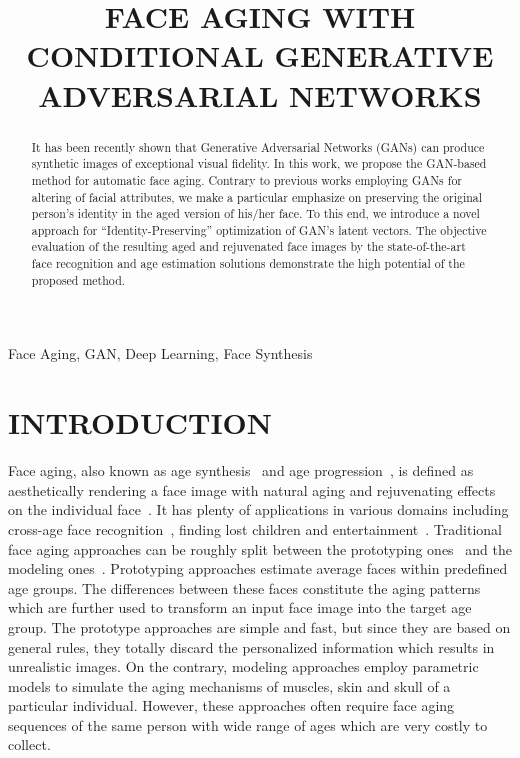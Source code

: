 \documentclass{article}
\title{FACE AGING WITH CONDITIONAL GENERATIVE ADVERSARIAL NETWORKS}
\begin{document}
\maketitle

\begin{abstract}

It has been recently shown that Generative Adversarial Networks (GANs) can produce synthetic images of exceptional visual fidelity.
In this work, we propose the GAN-based method for automatic face aging.
Contrary to previous works employing GANs for altering of facial attributes, we make a particular emphasize on preserving the original person's identity in the aged version of his/her face.
To this end, we introduce a novel approach for ``Identity-Preserving'' optimization of GAN's latent vectors.
The objective evaluation of the resulting aged and rejuvenated face images by the state-of-the-art face recognition and age estimation solutions demonstrate the high potential of the proposed method. 

\end{abstract}

\begin{keywords}

Face Aging, GAN, Deep Learning, Face Synthesis

\end{keywords}

\section{INTRODUCTION}
\label{sec:introduction}

Face aging, also known as age synthesis~\cite{fu2010age} and age progression~\cite{shu2015personalized}, is defined as aesthetically rendering a face image with natural aging and rejuvenating effects on the
individual face~\cite{fu2010age}.
It has plenty of applications in various domains including cross-age face recognition~\cite{park2010age}, finding lost children and entertainment~\cite{wang2016recurrent}.
Traditional face aging approaches can be roughly split between the prototyping ones~\cite{tiddeman2001prototyping,kemelmacher2014illumination} and the modeling ones~\cite{suo2010compositional,tazoe2012facial}.
Prototyping approaches estimate average faces within predefined age groups.
The differences between these faces constitute the aging patterns which are further used to transform an input face image into the target age group.
The prototype approaches are simple and fast, but since they are based on general rules, they totally discard the personalized information which results in unrealistic images.
On the contrary, modeling approaches employ parametric models to simulate the aging mechanisms of muscles, skin and skull of a particular individual.
However, these approaches often require face aging sequences of the same person with wide range of ages which are very costly to collect.
\end{document}
